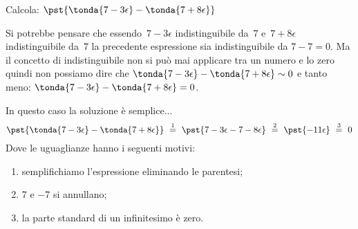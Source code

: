 \begin{esempio}
Calcola: \quad \(\pst{\tonda{7 -3\epsilon} - \tonda{7 +8\epsilon}}\)

\begin{osservazione}
 Si potrebbe pensare che essendo~\(7 -3\epsilon\) indistinguibile da~\(7\) 
e~\(7 +8\epsilon\) indistinguibile da~\(7\) la precedente espressione 
sia indistinguibile da \(7 - 7 = 0\).
Ma il concetto di indistinguibile non si può mai applicare tra un numero e 
lo zero quindi non possiamo dire che 
\(\tonda{7 -3\epsilon} - \tonda{7 +8\epsilon} \sim 0\) e 
tanto meno: \(\tonda{7 -3\epsilon} - \tonda{7 +8\epsilon} = 0\).
\end{osservazione}

In questo caso la soluzione è semplice...
\[\pst{\tonda{7 -3\epsilon} - \tonda{7 +8\epsilon}}
~ \stackrel{1}{=} ~
   \pst{7 -3\epsilon -7 -8\epsilon} 
~ \stackrel{2}{=} ~
   \pst{-11 \epsilon}
~ \stackrel{3}{=} ~ 0\]
Dove le uguaglianze hanno i seguenti motivi:
\begin{enumerate} [nosep]
 \item semplifichiamo l'espressione eliminando le parentesi; 
 \item \(7\) e \(-7\) si annullano; 
 \item la parte standard di un infinitesimo è zero.
\end{enumerate}
\end{esempio}

